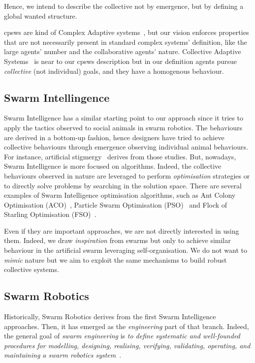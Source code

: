 \documentclass[11pt]{article}
\begin{document}
Hence, we intend to describe the collective not by emergence, but by defining a global wanted structure.

\acp{cpsw} are kind of Complex Adaptive systems~\cite{holland1992complex}, but our vision enforces properties that are not necessarily present in standard complex systems' definition, like the large agents' number and the collaborative agents' nature.
Collective Adaptive Systems~\cite{DBLP:journals/corr/abs-1108-5643} is near to our \acp{cpsw} description but in our definition agents pursue \emph{collective} (not individual) goals, and they have a homogenous behaviour.

\subsection{Swarm Intellingence}

Swarm Intelligence has a similar starting point to our approach since it tries to apply the tactics observed to social animals in swarm robotics. 
%
The behaviours are derived in a bottom-up fashion, hence designers have tried to achieve collective behaviours through emergence observing individual animal behaviours.
%
For instance, artificial stigmergy~\cite{DBLP:journals/fgcs/DorigoBT00} derives from those studies.
%
But, nowadays, Swarm Intelligence is more focused on algorithms.
% 
Indeed, the collective behaviours observed in nature are leveraged to perform \textit{optimisation} strategies or to directly solve problems by searching in the solution space.
There are several examples of Swarm Intelligence optimisation algorithms, such as Ant Colony Optimisation (ACO)~\cite{DBLP:journals/tsmc/DorigoMC96}, Particle Swarm Optimisation (PSO)~\cite{DBLP:conf/icnn/KennedyE95} and Flock of Starling Optimisation (FSO)~\cite{DBLP:series/sci/FulgineiS11}.

Even if they are important approaches, we are not directly interested in using them. 
%
Indeed, we draw \textit{inspiration} from swarms but only to achieve similar behaviour in the artificial swarm leveraging self-organisation. 
%
We do not want to \textit{mimic} nature but we aim to exploit the same mechanisms to build robust collective systems.

\subsection{Swarm Robotics}

Historically, Swarm Robotics derives from the first Swarm Intelligence approaches. 
%
Then, it has emerged as the \textit{engineering} part of that branch. 
%
Indeed, the general goal of \emph{swarm engineering} is \emph{to define systematic and well-founded procedures for modelling, designing, realising, verifying, validating, operating, and maintaining a swarm robotics system}~\cite{DBLP:journals/swarm/BrambillaFBD13}.
\end{document}
